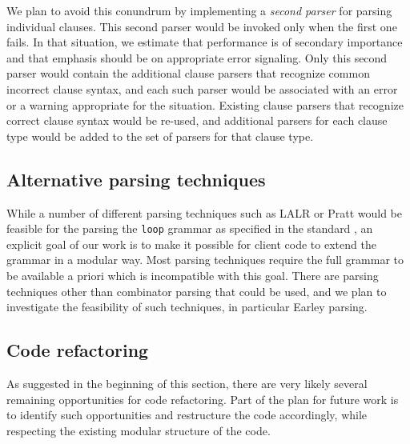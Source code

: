 We plan to avoid this conundrum by implementing a \emph{second parser}
for parsing individual clauses.  This second parser would be invoked
only when the first one fails.  In that situation, we estimate that
performance is of secondary importance and that emphasis should be on
appropriate error signaling.  Only this second parser would contain
the additional clause parsers that recognize common incorrect clause
syntax, and each such parser would be associated with an error or a
warning appropriate for the situation.  Existing clause parsers that
recognize correct clause syntax would be re-used, and additional
parsers for each clause type would be added to the set of parsers for
that clause type.

\subsection{Alternative parsing techniques}

While a number of different parsing techniques such as LALR
\cite{DeRemer:lalr} or Pratt \cite{Pratt:1973:TDO:512927.512931} would
be feasible for the parsing the \texttt{loop} grammar as specified in
the standard , an explicit goal of our work is to
make it possible for client code to extend the grammar in a modular
way.  Most parsing techniques require the full grammar to be available
a priori which is incompatible with this goal.  There are parsing
techniques other than combinator parsing that could be used, and we
plan to investigate the feasibility of such techniques, in particular
Earley \cite{Earley:1970:ECP:362007.362035} parsing.

\subsection{Code refactoring}

As suggested in the beginning of this section, there are very likely
several remaining opportunities for code refactoring.  Part of the
plan for future work is to identify such opportunities and restructure
the code accordingly, while respecting the existing modular structure
of the code.
